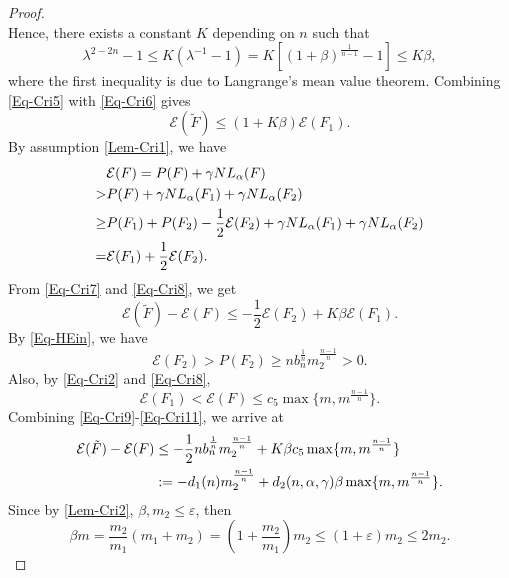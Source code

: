\documentclass[11pt,reqno]{amsart}
\theoremstyle{definition}
\theoremstyle{remark}
\numberwithin{equation}{section}
\renewcommand{\(}{\left(}
\renewcommand{\)}{\right)}
\renewcommand{\widetilde}{\tilde}
\renewcommand{\-}{\overline}
\begin{document}
\begin{proof}
\begin{equation*}
  \end{equation*}
  Hence, there exists a constant $K$ depending on $n$ such that 
 \begin{equation}\label{Eq-Cri6}
 	\lambda^{2-2n}-1\leq K(\lambda^{-1}-1)=K[(1+\beta)^{\frac{1}{n-1}}-1]\leq K\beta,
 \end{equation}
 where the first inequality is due to Langrange's mean value theorem. Combining \eqref{Eq-Cri5} with \eqref{Eq-Cri6} gives
 \begin{equation}\label{Eq-Cri7}
 	\mathcal{E}(\widetilde{F})\leq (1+K\beta)\mathcal{E}(F_1).
 \end{equation}
 By assumption \eqref{Lem-Cri1}, we have 
 \begin{align}
 	&\mathcal{E}(F)=P(F)+\gamma NL_{\alpha}(F)\notag\\
 	>&P(F)+\gamma NL_{\alpha}(F_1)+\gamma NL_{\alpha}(F_2)\notag\\
 	\geq&P(F_1)+P(F_2)-\frac{1}{2}\mathcal{E}(F_2)+\gamma NL_{\alpha}(F_1)+\gamma NL_{\alpha}(F_2)\notag\\
 	=&\mathcal{E}(F_1)+\frac{1}{2}\mathcal{E}(F_2).\label{Eq-Cri8}
 \end{align}
 From \eqref{Eq-Cri7} and \eqref{Eq-Cri8}, we get
 \begin{equation}\label{Eq-Cri9}
 		\mathcal{E}(\widetilde{F})-\mathcal{E}(F)\leq -\frac{1}{2}\mathcal{E}(F_2)+K\beta\mathcal{E}(F_1).
 \end{equation}
 By \eqref{Eq-HEin}, we have
 \begin{equation}\label{Eq-Cri10}
 	\mathcal{E}(F_2)>P(F_2)\geq n b_n^{\frac{1}{n}}m_2^{\frac{n-1}{n}}>0.
 \end{equation}
 Also, by \eqref{Eq-Cri2} and \eqref{Eq-Cri8},
 \begin{equation}\label{Eq-Cri11}
 	\mathcal{E}(F_1)<\mathcal{E}(F)\leq c_5\max\{m,m^{\frac{n-1}{n}}\}.
 \end{equation}
 Combining \eqref{Eq-Cri9}-\eqref{Eq-Cri11}, we arrive at
 \begin{align}
 	\mathcal{E}(\widetilde{F})-\mathcal{E}(F)&\leq -\frac{1}{2}n b_n^{\frac{1}{n}}m_2^{\frac{n-1}{n}}+K\beta c_5\max\{m,m^{\frac{n-1}{n}}\}\notag\\
 	&:=-d_1(n)m_2^{\frac{n-1}{n}}+d_2(n,\alpha,\gamma)\beta\max\{m,m^{\frac{n-1}{n}}\}.\label{Eq-Cri12}
 \end{align}
 Since by \eqref{Lem-Cri2}, $\beta,m_2\leq\varepsilon$, then 
 \begin{equation*}
 	\beta m=\frac{m_2}{m_1}(m_1+m_2)=(1+\frac{m_2}{m_1})m_2\leq (1+\varepsilon)m_2\leq 2m_2.

\end{equation*}
\end{proof}
\end{document}
